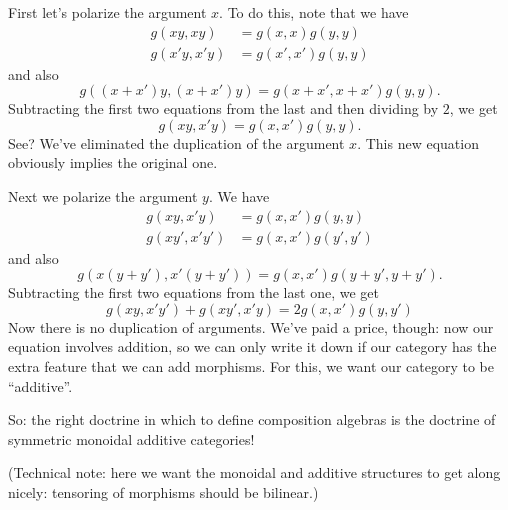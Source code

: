\documentclass{article}
\begin{document}
First let's polarize the argument \(x\). To do this, note that we have
\[
  \begin{aligned}
    g(xy,xy) &= g(x,x) g(y,y)
  \\g(x'y,x'y) &= g(x',x') g(y,y)
  \end{aligned}
\] and also \[g((x+x')y,(x+x')y) = g(x+x',x+x') g(y,y).\] Subtracting
the first two equations from the last and then dividing by \(2\), we get
\[g(xy,x'y) = g(x,x') g(y,y).\] See? We've eliminated the duplication of
the argument \(x\). This new equation obviously implies the original
one.

Next we polarize the argument \(y\). We have \[
  \begin{aligned}
    g(xy,x'y) &= g(x,x') g(y,y)
  \\g(xy',x'y') &= g(x,x') g(y',y')
  \end{aligned}
\] and also \[g(x(y+y'),x'(y+y')) = g(x,x') g(y+y',y+y').\] Subtracting
the first two equations from the last one, we get
\[g(xy,x'y') + g(xy',x'y) = 2 g(x,x') g(y,y')\] Now there is no
duplication of arguments. We've paid a price, though: now our equation
involves addition, so we can only write it down if our category has the
extra feature that we can add morphisms. For this, we want our category
to be ``additive''.

So: the right doctrine in which to define composition algebras is the
doctrine of symmetric monoidal additive categories!

(Technical note: here we want the monoidal and additive structures to
get along nicely: tensoring of morphisms should be bilinear.)
\end{document}
